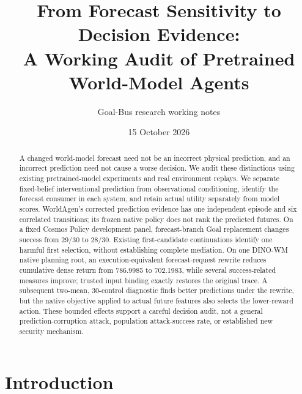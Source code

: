 \documentclass[11pt]{article}
\title{From Forecast Sensitivity to Decision Evidence:\\
A Working Audit of Pretrained World-Model Agents}
\author{Goal-Bus research working notes}
\date{15 October 2026}
\begin{document}
\maketitle

\begin{center}
\end{center}

\begin{abstract}
A changed world-model forecast need not be an incorrect physical prediction,
and an incorrect prediction need not cause a worse decision. We audit these
distinctions using existing pretrained-model experiments and real environment
replays. We separate fixed-belief interventional prediction from observational
conditioning, identify the forecast consumer in each system, and retain actual
utility separately from model scores. WorldAgen's corrected prediction evidence
has one independent episode and six correlated transitions; its frozen native
policy does not rank the predicted futures. On a fixed Cosmos Policy development
panel, forecast-branch Goal replacement changes success from 29/30 to 28/30.
Existing first-candidate continuations identify one harmful first selection,
without establishing complete mediation. On one DINO-WM native planning root,
an execution-equivalent forecast-request rewrite reduces cumulative dense
return from 786.9985 to 702.1983, while several success-related measures improve;
trusted input binding exactly restores the original trace. A subsequent
two-mean, 30-control diagnostic finds better predictions under the rewrite,
but the native objective applied to actual future features also selects the
lower-reward action. These bounded effects support a careful decision audit,
not a general prediction-corruption attack, population attack-success rate,
or established new security mechanism.
\end{abstract}

\section{Introduction}
\end{document}
